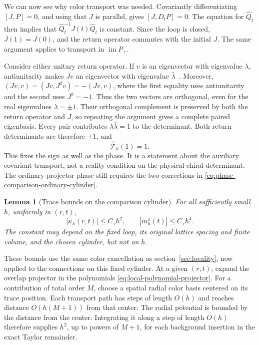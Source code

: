 \documentclass[11pt,a4paper]{article}
\newtheorem{lemma}[theorem]{Lemma}
\theoremstyle{remark}
\DeclareMathOperator{\im}{im}
\begin{document}
We can now see why color transport was needed. Covariantly differentiating
$[J,P]=0$, and using that $J$ is parallel, gives $[J,D_tP]=0$.
The equation for $\widehat Q_t$ then implies that
$\widehat Q_t^{-1}J(t)\widehat Q_t$ is constant. Since the loop is
closed, $J(1)=J(0)$, and the return operator commutes with the initial
$J$. The same argument applies to transport in $\im P_+$.

Consider either unitary return operator. If $v$ is an eigenvector with
eigenvalue $\lambda$, antiunitarity makes $Jv$ an eigenvector with
eigenvalue $\bar\lambda$~\cite[sect.~3]{SuzukiReal}.
Moreover,
$(Jv,v)=(Jv,J^2v)=-(Jv,v)$, where the first equality uses
antiunitarity and the second uses $J^2=-1$. Thus the two vectors are
orthogonal, even for the real eigenvalues $\lambda=\pm1$.
Their orthogonal complement is preserved by both the return operator
and $J$, so repeating the argument gives a complete paired eigenbasis.
Every pair contributes $\lambda\bar\lambda=1$ to the determinant.
Both return determinants are therefore $+1$, and
\begin{equation}
 \widehat{\mathcal T}_h(1)=1 .
\end{equation}
This fixes the sign as well as the phase. It is a statement about the
auxiliary covariant transport, not a reality condition on the physical
chiral determinant. The ordinary projector phase still requires the two
corrections in \eqref{eq:phase-comparison-ordinary-cylinder}.

\begin{lemma}[Trace bounds on the comparison cylinder]
\label{lem:fixed-family-traces}
For all sufficiently small $h$, uniformly in $(r,t)$,
\begin{equation}
 |\kappa_h(r,t)|\le C_\gamma h^2,\qquad
 |m_h^1(t)|\le C_\gamma h^4 .
 \label{eq:phase-bounds}
\end{equation}
The constant may depend on the fixed loop, its original lattice spacing
and finite volume, and the chosen cylinder, but not on $h$.
\end{lemma}

These bounds use the same color cancellation as
section~\ref{sec:locality}, now applied to the connections on this fixed
cylinder. At a given $(r,t)$, expand the overlap projector in the
polynomials \eqref{eq:local-polynomial-projector}. For a contribution
of total order $M$, choose a spatial radial color basis centered on its
trace position. Each transport path has steps of length $O(h)$ and
reaches distance $O(h(M+1))$ from that center. The radial potential is
bounded by the distance from the center. Integrating it along a step
of length $O(h)$ therefore supplies $h^2$, up to powers of $M+1$, for
each background insertion in the exact Taylor remainder.
\end{document}

